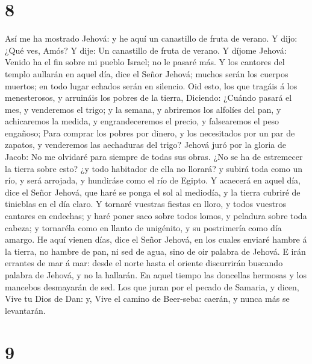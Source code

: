 \hypertarget{section-7}{%
\section{8}\label{section-7}}

 Así me ha mostrado Jehová: y he aquí un canastillo de
fruta de verano.  Y dijo: ¿Qué ves, Amós? Y dije: Un
canastillo de fruta de verano. Y díjome Jehová: Venido ha el fin sobre
mi pueblo Israel; no le pasaré más.  Y los cantores del
templo aullarán en aquel día, dice el Señor Jehová; muchos serán los
cuerpos muertos; en todo lugar echados serán en silencio. 
Oid esto, los que tragáis á los menesterosos, y arruináis los pobres de
la tierra,  Diciendo: ¿Cuándo pasará el mes, y venderemos
el trigo; y la semana, y abriremos los alfolíes del pan, y achicaremos
la medida, y engrandeceremos el precio, y falsearemos el peso engañoso;
 Para comprar los pobres por dinero, y los necesitados por
un par de zapatos, y venderemos las aechaduras del trigo? 
Jehová juró por la gloria de Jacob: No me olvidaré para siempre de todas
sus obras.  ¿No se ha de estremecer la tierra sobre esto?
¿y todo habitador de ella no llorará? y subirá toda como un río, y será
arrojada, y hundiráse como el río de Egipto.  Y acaecerá
en aquel día, dice el Señor Jehová, que haré se ponga el sol al
mediodía, y la tierra cubriré de tinieblas en el día claro.
 Y tornaré vuestras fiestas en lloro, y todos vuestros
cantares en endechas; y haré poner saco sobre todos lomos, y peladura
sobre toda cabeza; y tornaréla como en llanto de unigénito, y su
postrimería como día amargo.  He aquí vienen días, dice
el Señor Jehová, en los cuales enviaré hambre á la tierra, no hambre de
pan, ni sed de agua, sino de oir palabra de Jehová.  E
irán errantes de mar á mar: desde el norte hasta el oriente discurrirán
buscando palabra de Jehová, y no la hallarán.  En aquel
tiempo las doncellas hermosas y los mancebos desmayarán de sed.
 Los que juran por el pecado de Samaria, y dicen, Vive tu
Dios de Dan: y, Vive el camino de Beer-seba: caerán, y nunca más se
levantarán.

\hypertarget{section-8}{%
\section{9}\label{section-8}}


